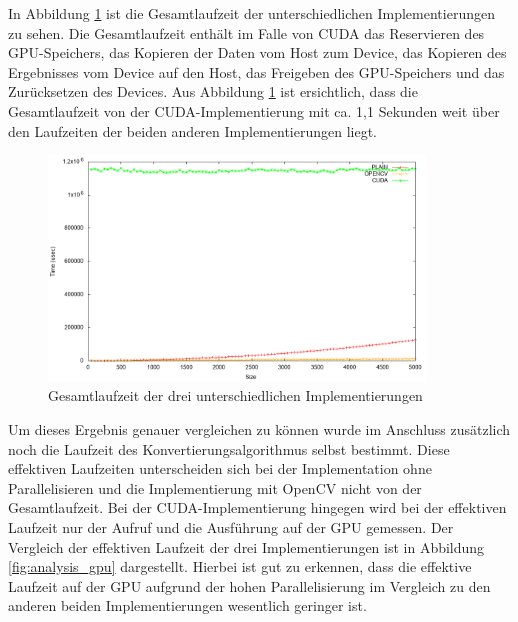 \documentclass{llncs}
\begin{document}
In Abbildung \ref{fig:analysis} ist die Gesamtlaufzeit der unterschiedlichen Implementierungen zu sehen. Die Gesamtlaufzeit enthält im Falle von CUDA das Reservieren des GPU-Speichers, das Kopieren der Daten vom Host zum Device, das Kopieren des Ergebnisses vom Device auf den Host, das Freigeben des GPU-Speichers und das Zurücksetzen des Devices. Aus Abbildung \ref{fig:analysis} ist ersichtlich, dass die Gesamtlaufzeit von der CUDA-Implementierung mit ca. 1,1 Sekunden weit über den Laufzeiten der beiden anderen Implementierungen liegt.

\begin{figure}
	\centering
	\includegraphics[width=10cm,keepaspectratio]{analysis.png}
	\caption{Gesamtlaufzeit der drei unterschiedlichen Implementierungen}
	\label{fig:analysis}
\end{figure}

Um dieses Ergebnis genauer vergleichen zu können wurde im Anschluss zusätzlich noch die Laufzeit des Konvertierungsalgorithmus selbst bestimmt. Diese effektiven Laufzeiten unterscheiden sich bei der Implementation ohne Parallelisieren und die Implementierung mit OpenCV nicht von der Gesamtlaufzeit. Bei der CUDA-Implementierung hingegen wird bei der effektiven Laufzeit nur der Aufruf und die Ausführung auf der GPU gemessen. Der Vergleich der effektiven Laufzeit der drei Implementierungen ist in Abbildung \ref{fig:analysis_gpu} dargestellt. Hierbei ist gut zu erkennen, dass die effektive Laufzeit auf der GPU aufgrund der hohen Parallelisierung im Vergleich zu den anderen beiden Implementierungen wesentlich geringer ist.
\end{document}
